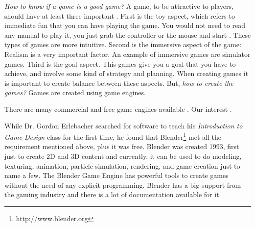 \textit{How to know if a game is a good game?} A game, to be attractive to players, should have at least three important \cite{bookGameKit2}. First is the toy aspect, which refers to immediate fun that you can have playing the game. You would not need to read any manual to play it, you just grab the controller or the mouse and start . These types of games are more intuitive. Second is the immersive aspect of the game:  Realism is a very important factor.  An example of immersive games are simulator games. Third is the goal aspect. This games give you a goal that you have to achieve, and involve some kind of strategy and planning. When creating games it is important to create balance between these aspects. But, \textit{how to create the games?} Games are created using game engines.


 There are many commercial and free game engines available . Our interest  .  



While Dr. Gordon Erlebacher searched for software to teach his \textit{Introduction to Game Design} class for the first time, he found that Blender\footnote{http://www.blender.org} met all the requirement mentioned above, plus it was free. Blender was created 1993, first just to create 2D and 3D content and currently, it can be used to do modeling, texturing, animation, particle simulation, rendering, and game creation just to name a few. The Blender Game Engine has powerful tools to create games without the need of any explicit programming. Blender has a big support from the gaming industry and there is a lot of documentation available for it.  

